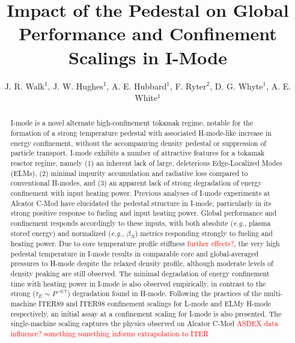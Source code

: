\documentclass[12pt]{iopart}
\newcommand{\eg}{\emph{e.g., }}
\renewcommand{\note}[1]{\textcolor{red}{#1}}
\begin{document}
\title[Global Performance and Confinement in I-mode]{Impact of the Pedestal on Global Performance and Confinement Scalings in I-Mode}
\author{J. R. Walk$^{1}$, J. W. Hughes$^{1}$, A. E. Hubbard$^{1}$, F. Ryter$^{2}$, D. G. Whyte$^{1}$, A. E. White$^{1}$}
\address{$^1$ MIT Plasma Science and Fusion Center, 77 Massachusetts Avenue, Cambridge, MA 02139}
\address{$^2$ Max-Planck-Institut f\"ur Plasmaphysik}

\begin{abstract}
I-mode is a novel alternate high-confinement tokamak regime, notable for the formation of a strong temperature pedestal with associated H-mode-like increase in energy confinement, without the accompanying density pedestal or suppression of particle transport.
I-mode exhibits a number of attractive features for a tokamak reactor regime, namely (1) an inherent lack of large, deleterious Edge-Localized Modes (ELMs), (2) minimal impurity accumulation and radiative loss compared to conventional H-modes, and (3) an apparent lack of strong degradation of energy confinement with input heating power.  
Previous analyses of I-mode experiments at Alcator C-Mod have elucidated the pedestal structure in I-mode, particularly in its strong positive response to fueling and input heating power.
Global performance and confinement responds accordingly to these inputs, with both absolute (\eg plasma stored energy) and normalized (\eg $\beta_N$) metrics responding strongly to fueling and heating power.
Due to core temperature profile stiffness \note{further effects?}, the very high pedestal temperature in I-mode results in comparable core and global-averaged pressures to H-mode despite the relaxed density profile, although moderate levels of density peaking are still observed.
The minimal degradation of energy confinement time with heating power in I-mode is also observed empirically, in contrast to the strong ($\tau_E \sim P^{-0.7}$) degradation found in H-mode.
Following the practices of the multi-machine ITER89 and ITER98 confinement scalings for L-mode and ELMy H-mode respectively, an initial assay at a confinement scaling for I-mode is also presented.
The single-machine scaling captures the physics observed on Alcator C-Mod \note{ASDEX data influence?}
\note{something something informs extrapolation to ITER}
\end{abstract}


\maketitle
\end{document}
